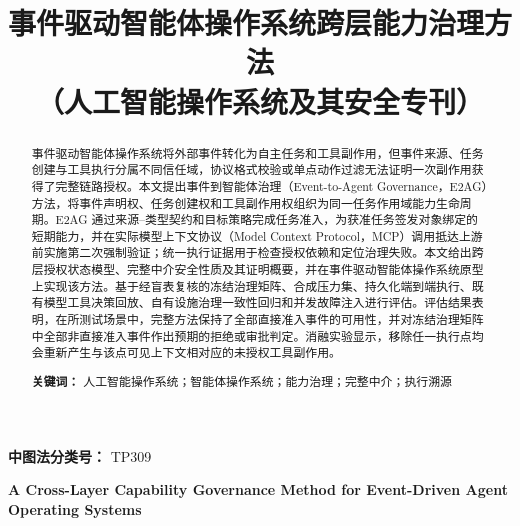 \documentclass[UTF8,zihao=5,fontset=none]{ctexart}
\title{\bfseries\zihao{-2} 事件驱动智能体操作系统跨层能力治理方法\\[0.25em]
{\zihao{-3}（人工智能操作系统及其安全专刊）}}
\author{}
\date{}
\begin{document}
\maketitle

\begin{abstract}
事件驱动智能体操作系统将外部事件转化为自主任务和工具副作用，但事件来源、任务创建与工具执行分属不同信任域，协议格式校验或单点动作过滤无法证明一次副作用获得了完整链路授权。本文提出事件到智能体治理（Event-to-Agent Governance，E2AG）方法，将事件声明权、任务创建权和工具副作用权组织为同一任务作用域能力生命周期。E2AG 通过来源--类型契约和目标策略完成任务准入，为获准任务签发对象绑定的短期能力，并在实际模型上下文协议（Model Context Protocol，MCP）调用抵达上游前实施第二次强制验证；统一执行证据用于检查授权依赖和定位治理失败。本文给出跨层授权状态模型、完整中介安全性质及其证明概要，并在事件驱动智能体操作系统原型上实现该方法。基于经盲表复核的冻结治理矩阵、合成压力集、持久化端到端执行、既有模型工具决策回放、自有设施治理一致性回归和并发故障注入进行评估。评估结果表明，在所测试场景中，完整方法保持了全部直接准入事件的可用性，并对冻结治理矩阵中全部非直接准入事件作出预期的拒绝或审批判定。消融实验显示，移除任一执行点均会重新产生与该点可见上下文相对应的未授权工具副作用。

\noindent\textbf{关键词：} 人工智能操作系统；智能体操作系统；能力治理；完整中介；执行溯源
\end{abstract}

\noindent\textbf{中图法分类号：} TP309

\begin{center}
{\bfseries\large A Cross-Layer Capability Governance Method for Event-Driven Agent Operating Systems}
\end{center}
\end{document}
